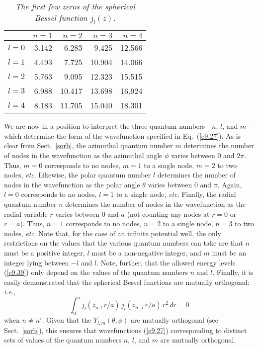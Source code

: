\begin{table}\centering
\begin{tabular}{c|rrrr}\hline
&$n=1$&$n=2$&$n=3$&$n=4$\\\hline
$l=0$ & 3.142 & 6.283 & 9.425& 12.566\\[0.5ex]
$l=1$ & 4.493 & 7.725 & 10.904 & 14.066\\[0.5ex]
$l=2$ & 5.763 & 9.095 & 12.323& 15.515\\[0.5ex]
$l=3$ & 6.988 & 10.417 & 13.698 & 16.924\\[0.5ex]
$l=4$ & 8.183 & 11.705 & 15.040 & 18.301
\end{tabular}
\caption{\em The first few zeros of the spherical Bessel function $j_l(z)$.}\label{tsph}
\end{table}

We are now in a position to interpret the three quantum numbers---$n$, $l$,
and $m$---which determine the form of the wavefunction
specified in Eq.~(\ref{e9.27}). As is clear from Sect.~\ref{sorb}, the
azimuthal quantum number $m$ determines the number of nodes in the
wavefunction as the azimuthal angle $\phi$ varies between 0 and $2\pi$. Thus, $m=0$
corresponds to no nodes, $m=1$ to a single node, $m=2$ to two nodes,
{\em etc}. Likewise, the polar quantum number $l$ determines the
number of nodes in the wavefunction as the polar angle $\theta$ varies between 0 and $\pi$.
Again, $l=0$ corresponds to no nodes, $l=1$ to a single node,
{\em etc}. Finally, the radial quantum number $n$ determines
the number of nodes in the wavefunction as the radial
variable $r$ varies between 0 and $a$ (not counting any
nodes at $r=0$ or $r=a$). Thus, $n=1$ corresponds to no nodes,
$n=2$ to a single node, $n=3$ to two nodes, {\em etc}. Note that,
for the
case of an infinite potential well,
the only restrictions on the values that the various quantum numbers can take  are that $n$ must be a positive integer, $l$ must be
a non-negative integer, and $m$ must be an integer lying between $-l$ and $l$. Note, further,
that the allowed energy levels (\ref{e9.39}) only depend on the
values of the quantum numbers $n$ and $l$. Finally, it is
easily demonstrated that the spherical Bessel functions are mutually
orthogonal: {\em i.e.}, 
\begin{equation}
\int_0^a j_l(z_{n,l}\,r/a)\,j_{l}(z_{n',l}\,r/a) \,r^2\,dr = 0
\end{equation}
when $n\neq n'$. 
Given that the $Y_{l,m}(\theta,\phi)$ are mutually orthogonal (see Sect.~\ref{sorb}), this ensures that wavefunctions (\ref{e9.27}) corresponding to distinct
sets of values of the quantum numbers $n$, $l$, and $m$ are mutually
orthogonal.

